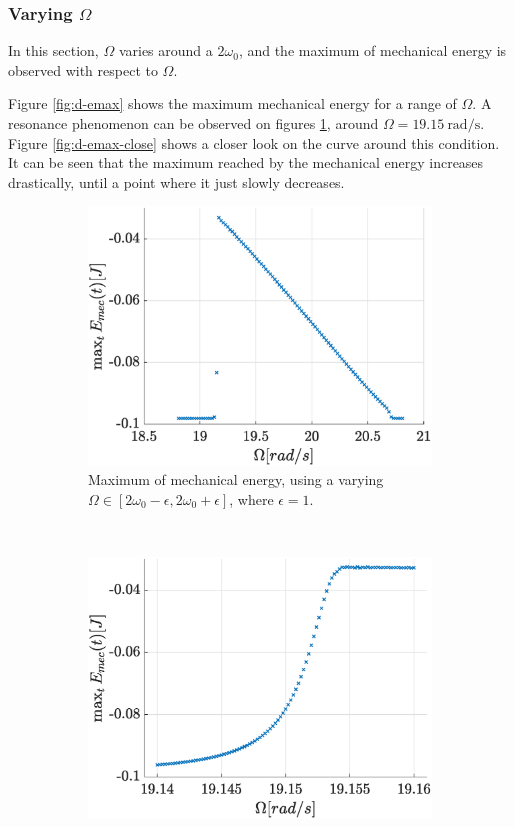 \documentclass[a4paper,12pt,twoside]{article}
\begin{document}
\subsubsection{Varying $\Omega$}
In this section, $\Omega$ varies around a $2\omega_0$, and the maximum of mechanical energy is observed with respect to $\Omega$.

Figure \ref{fig:d-emax} shows the maximum mechanical energy for a range of $\Omega$.
A resonance phenomenon can be observed on figures \ref{fig:d-emax-full}, around $\Omega=\SI{19.15}{\radian\per\s}$.
Figure \ref{fig:d-emax-close} shows a closer look on the curve around this condition.
It can be seen that the maximum reached by the mechanical energy increases drastically, until a point where it just slowly decreases.

\begin{figure}[h]
\centering
	\begin{subfigure}[t]{0.45\textwidth}
		\includegraphics[width=\textwidth]{graphs/d_emax_full.eps}
		\caption{Maximum of mechanical energy, using a varying $\Omega\in\left[2\omega_0 - \epsilon, 2\omega_0 + \epsilon\right]$, where $\epsilon = \num{1}$.}
		\label{fig:d-emax-full}
	\end{subfigure}
	~
	\begin{subfigure}[t]{0.45\textwidth}
		\includegraphics[width=\textwidth]{graphs/d_emax_close.eps}

\end{subfigure}
\end{figure}
\end{document}
